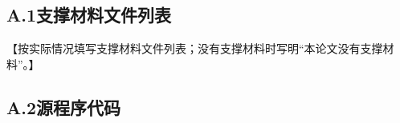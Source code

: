 \subsection*{A.1\quad 支撑材料文件列表}

【按实际情况填写支撑材料文件列表；没有支撑材料时写明“本论文没有支撑材料”。】

\subsection*{A.2\quad 源程序代码}


